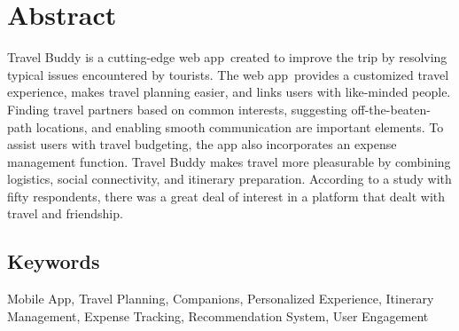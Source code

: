 \chapter*{Abstract}%
%
Travel Buddy is a cutting-edge web app created to improve the trip by resolving typical issues encountered by tourists. The web app provides a customized travel experience, makes travel planning easier, and links users with like-minded people. Finding travel partners based on common interests, suggesting off-the-beaten-path locations, and enabling smooth communication are important elements. To assist users with travel budgeting, the app also incorporates an expense management function. Travel Buddy makes travel more pleasurable by combining logistics, social connectivity, and itinerary preparation. According to a study with fifty respondents, there was a great deal of interest in a platform that dealt with travel and friendship.



\section*{Keywords}

Mobile App, Travel Planning, Companions, Personalized Experience, Itinerary Management, Expense Tracking, Recommendation System, User Engagement


\thispagestyle{plain}

